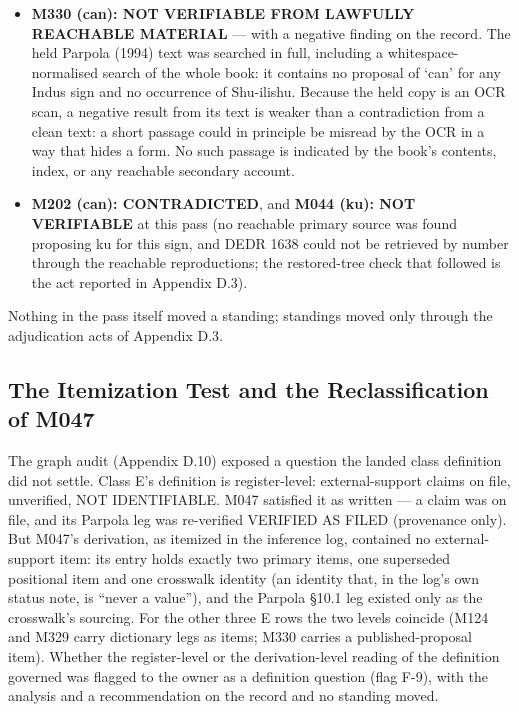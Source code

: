 \documentclass[11pt]{article}
\begin{document}
\begin{itemize}
  bark', identical to the restored tree's entry 4524 --- there
  is no tree-vs-print divergence --- and that poṉ is entry
  \textbf{4570} in print and tree alike, at the print page
  (p.~404) verified above. The dictionary leg therefore stands
  at the corrected entry number, DEDR 4570; amending the filed
  citation in the anchors record is a separate act.
\item
  \textbf{M330 (can): NOT VERIFIABLE FROM LAWFULLY REACHABLE
  MATERIAL} --- with a negative finding on the record. The held
  Parpola (1994) text was searched in full, including a
  whitespace-normalised search of the whole book: it contains
  no proposal of `can' for any Indus sign and no occurrence of
  Shu-ilishu. Because the held copy is an OCR scan, a negative
  result from its text is weaker than a contradiction from a
  clean text: a short passage could in principle be misread by
  the OCR in a way that hides a form. No such passage is
  indicated by the book's contents, index, or any reachable
  secondary account.
\item
  \textbf{M202 (can): CONTRADICTED}, and \textbf{M044 (ku): NOT
  VERIFIABLE} at this pass (no reachable primary source was
  found proposing ku for this sign, and DEDR 1638 could not be
  retrieved by number through the reachable reproductions; the
  restored-tree check that followed is the act reported in
  Appendix D.3).
\end{itemize}

Nothing in the pass itself moved a standing; standings moved
only through the adjudication acts of Appendix D.3.

\subsection{The Itemization Test and the Reclassification of
M047}\label{appendix-d5-f9}

The graph audit (Appendix D.10) exposed a question the landed
class definition did not settle. Class E's definition is
register-level: external-support claims on file, unverified, NOT
IDENTIFIABLE. M047 satisfied it as written --- a claim was on
file, and its Parpola leg was re-verified VERIFIED AS FILED
(provenance only). But M047's derivation, as itemized in the
inference log, contained no external-support item: its entry
holds exactly two primary items, one superseded positional item
and one crosswalk identity (an identity that, in the log's own
status note, is ``never a value''), and the Parpola §10.1 leg
existed only as the crosswalk's sourcing. For the other three E
rows the two levels coincide (M124 and M329 carry dictionary
legs as items; M330 carries a published-proposal item). Whether
the register-level or the derivation-level reading of the
definition governed was flagged to the owner as a definition
question (flag F-9), with the analysis and a recommendation on
the record and no standing moved.
\end{document}
